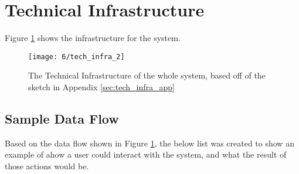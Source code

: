 \documentclass[../dissertation.tex]{subfiles}
\begin{document}
\section{Technical Infrastructure}

Figure \ref{fig:techinfra} shows the infrastructure for the system.

\begin{figure}
    \centering
    \texttt{[image: 6/tech\_infra\_2]}
    \caption{The Technical Infrastructure of the whole system, based off of the sketch in Appendix \ref{sec:tech_infra_app}}
    \label{fig:techinfra}
\end{figure}

\subsection{Sample Data Flow}

Based on the data flow shown in Figure \ref{fig:techinfra}, the below list was created to show an example of ahow a user could interact with the system, and what the result of those actions would be.
\end{document}
